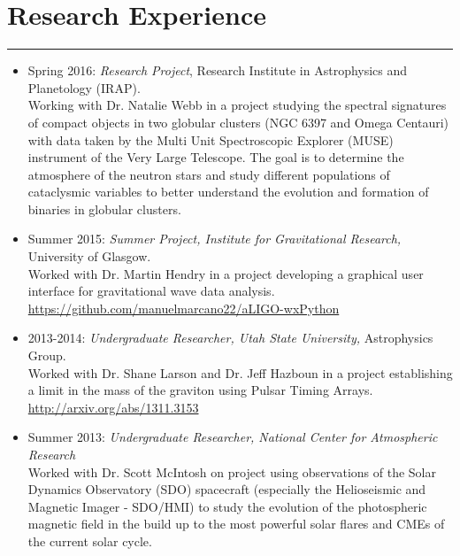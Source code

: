 \documentclass[letterpaper,10pt]{article}
\begin{document}

\section*{Research Experience}

\hrule
\vspace{.3 cm}



\begin{itemize}[label=$\blacktriangleright$]
        \item Spring 2016: \emph{Research Project}, Research Institute in Astrophysics and Planetology (IRAP).\\
                Working with Dr. Natalie Webb in a project studying the spectral signatures of compact objects in two globular clusters (NGC 6397 and Omega Centauri) with data taken by the Multi Unit Spectroscopic Explorer (MUSE) instrument of the Very Large Telescope. The goal is to determine the atmosphere of the neutron stars and study different populations of cataclysmic variables to better understand the evolution and formation of binaries in globular clusters. 
\end{itemize}



\begin{itemize}[label=$\blacktriangleright$]
\item Summer 2015: \emph{Summer Project,  Institute for Gravitational Research,} University of Glasgow.\\
 Worked with Dr. Martin Hendry in a project developing a graphical user interface for gravitational wave data analysis. \url{https://github.com/manuelmarcano22/aLIGO-wxPython}
\end{itemize}



\begin{itemize}[label=$\blacktriangleright$]
  \item 2013-2014: \emph{Undergraduate Researcher, Utah State University,} Astrophysics Group.  \\
  Worked with Dr. Shane Larson and Dr. Jeff Hazboun in a project establishing a limit in the mass of the graviton using Pulsar Timing Arrays. \url{http://arxiv.org/abs/1311.3153}
  \end{itemize}

\begin{itemize}[label=$\blacktriangleright$]
  \item Summer 2013: \emph{Undergraduate Researcher, National Center for Atmospheric Research} \\
Worked with Dr. Scott McIntosh on project using observations of the Solar Dynamics Observatory (SDO) spacecraft (especially the Helioseismic and Magnetic Imager - SDO/HMI) to study the evolution of the photospheric magnetic field in the build up to the most powerful solar flares and CMEs of the current solar cycle.
  \end{itemize}
\end{document}
